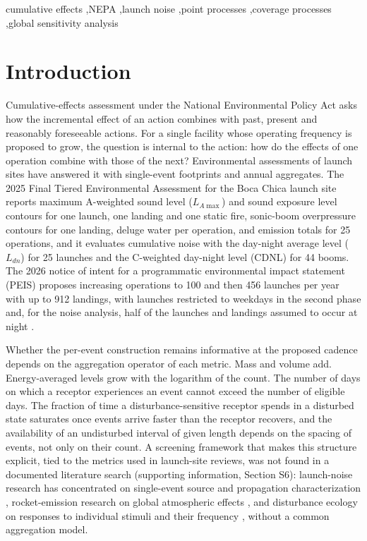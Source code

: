 \documentclass[preprint,12pt,authoryear]{elsarticle}
\begin{document}
\begin{frontmatter}
\begin{keyword}
cumulative effects \sep NEPA \sep launch noise \sep point processes \sep coverage processes \sep global sensitivity analysis
\end{keyword}
\end{frontmatter}

\section{Introduction}

Cumulative-effects assessment under the National Environmental Policy Act asks how the incremental effect of an action combines with past, present and reasonably foreseeable actions. For a single facility whose operating frequency is proposed to grow, the question is internal to the action: how do the effects of one operation combine with those of the next? Environmental assessments of launch sites have answered it with single-event footprints and annual aggregates. The 2025 Final Tiered Environmental Assessment for the Boca Chica launch site \citep{tieredea2025} reports maximum A-weighted sound level ($L_{A\max}$) and sound exposure level contours for one launch, one landing and one static fire, sonic-boom overpressure contours for one landing, deluge water per operation, and emission totals for 25 operations, and it evaluates cumulative noise with the day-night average level ($L_{dn}$) for 25 launches and the C-weighted day-night level (CDNL) for 44 booms. The 2026 notice of intent for a programmatic environmental impact statement (PEIS) proposes increasing operations to 100 and then 456 launches per year with up to 912 landings, with launches restricted to weekdays in the second phase and, for the noise analysis, half of the launches and landings assumed to occur at night \citep{noi2026,noiupdate2026}.

Whether the per-event construction remains informative at the proposed cadence depends on the aggregation operator of each metric. Mass and volume add. Energy-averaged levels grow with the logarithm of the count. The number of days on which a receptor experiences an event cannot exceed the number of eligible days. The fraction of time a disturbance-sensitive receptor spends in a disturbed state saturates once events arrive faster than the receptor recovers, and the availability of an undisturbed interval of given length depends on the spacing of events, not only on their count. A screening framework that makes this structure explicit, tied to the metrics used in launch-site reviews, was not found in a documented literature search (supporting information, Section S6): launch-noise research has concentrated on single-event source and propagation characterization \citep{gee2024,gee2025,kellison2023}, rocket-emission research on global atmospheric effects \citep{ross2014,maloney2022,ryan2022,barker2024}, and disturbance ecology on responses to individual stimuli and their frequency \citep{lafferty2001,collop2016,vanderkolk2024}, without a common aggregation model.
\end{document}
